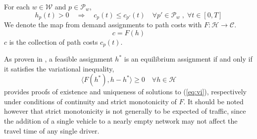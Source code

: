 \noindent For each $w\in\mathcal{W}$ and $p\in \mathcal{P}_w$,
\begin{equation}
h_p(t) > 0 \quad
 \Rightarrow \quad c_p(t) \leq c_{p'}(t) \quad \forall p'\in\mathcal{P}_w \;,\; 
 \forall t\in[0,T]
\end{equation}
We denote the map from demand assignments to path costs with $F : \mathcal{H}\rightarrow \mathcal{C}$. 
\begin{equation}
c = F(h)
\end{equation}
$c$ is the collection of path costs $c_p(t)$.

As proven in \cite{patriksson2015traffic}, a feasible assignment $h^*$ is an equilibrium assignment if and only if it satisfies the variational inequality,
\begin{equation}
\label{eq:vi}
\langle F(h^*), h-h^* \rangle \geq 0 \quad \forall h\in\mathcal{H}
\end{equation}
\cite{nagurney2013network} provides proofs of existence and uniqueness of solutions to (\ref{eq:vi}), respectively under conditions of continuity and strict monotonicity of $F$. It should be noted however that strict monotonicity is not generally to be expected of traffic, since the addition of a single vehicle to a nearly empty network may not affect the travel time of any single driver.

